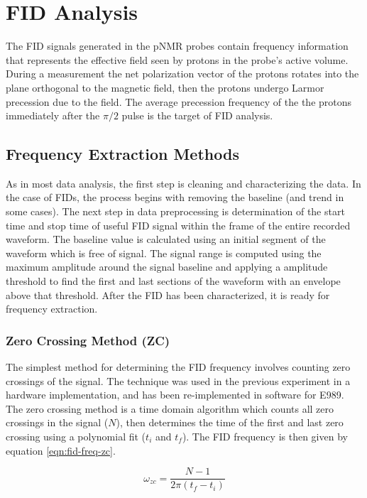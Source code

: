 \chapter{FID Analysis}

The FID signals generated in the pNMR probes contain frequency information that represents the effective field seen by protons in the probe's active volume.  During a measurement the net polarization vector of the protons rotates into the plane orthogonal to the magnetic field, then the protons undergo Larmor precession due to the field.  The average precession frequency of the the protons immediately after the $\pi/2$ pulse is the target of FID analysis.

\section{Frequency Extraction Methods}

As in most data analysis, the first step is cleaning and characterizing the data.  In the case of FIDs, the process begins with removing the baseline (and trend in some cases).  The next step in data preprocessing is determination of the start time and stop time of useful FID signal within the frame of the entire recorded waveform.  The baseline value is calculated using an initial segment of the waveform which is free of signal.  The signal range is computed using the maximum amplitude around the signal baseline and applying a amplitude threshold to find the first and last sections of the waveform with an envelope above that threshold.  After the FID has been characterized, it is ready for frequency extraction.


\subsection{Zero Crossing Method (ZC)}
The simplest method for determining the FID frequency involves counting zero crossings of the signal.  The technique was used in the previous \mugmtwo experiment in a hardware implementation, and has been re-implemented in software for E989.  The zero crossing method is a time domain algorithm which counts all zero crossings in the signal ($N$), then determines the time of the first and last zero crossing using a polynomial fit ($t_i$ and $t_f$).  The FID frequency is then given by equation \ref{eqn:fid-freq-zc}.

\begin{equation}
\label{eqn:fid-freq-zc}
\omega_{zc} = \frac{N - 1}{2 \pi(t_f - t_i)}
\end{equation}

